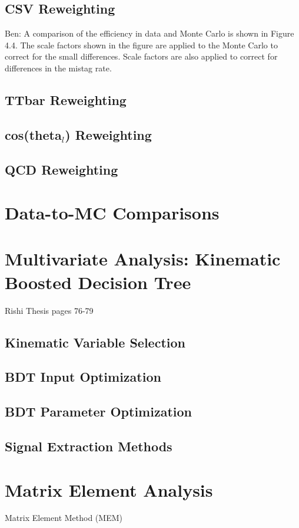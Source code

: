 \subsection{CSV Reweighting}
Ben: A comparison of the efficiency in data and Monte Carlo is shown in Figure 4.4. The scale factors shown in the figure are applied to the Monte Carlo to correct for the small differences. Scale factors are also applied to correct for differences in the mistag rate.


\subsection{TTbar Reweighting}
\subsection{cos(theta$_l$) Reweighting}
\subsection{QCD Reweighting}

\section{Data-to-MC Comparisons}

\section{Multivariate Analysis: Kinematic Boosted Decision Tree}
Rishi Thesis pages 76-79
\subsection{Kinematic Variable Selection}
\subsection{BDT Input Optimization}
\subsection{BDT Parameter Optimization}
\subsection{Signal Extraction Methods}

\section{Matrix Element Analysis}
Matrix Element Method (MEM)


